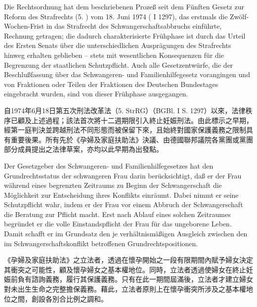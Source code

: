 \documentclass[12pt]{article}
\begin{document}
\begin{sourcepara}[title={原文SondervotumMS.281}]
Die Rechtsordnung hat dem beschriebenen Prozeß seit dem Fünften Gesetz zur Reform des Strafrechts (5. \abbrStrRG{}) vom 18. Juni 1974 (\abbrBGBl{} I \abbrS{} 1297), das erstmals die Zwölf-Wochen-Frist in das Strafrecht des Schwangerschaftsabbruchs einführte, Rechnung getragen; die dadurch charakterisierte Frühphase ist durch das Urteil des Ersten Senats über die unterschiedlichen Ausprägungen des Strafrechts hinweg erhalten geblieben -- stets mit wesentlichen Konsequenzen für die Begrenzung der staatlichen Schutzpflicht. Auch alle Gesetzentwürfe, die der Beschlußfassung über das Schwangeren- und Familienhilfegesetz vorangingen und von Fraktionen oder Teilen der Fraktionen des Deutschen Bundestages eingebracht wurden, sind von dieser Frühphase ausgegangen.
\end{sourcepara}
\begin{transpara}
自1974年6月18日第五次刑法改革法（5. StrRG）（BGBl. I S. 1297）以來，法律秩序已顧及上述過程；該法首次將十二週期限引入終止妊娠刑法。由此標示之早期，經第一庭判決並跨越刑法不同形態而被保留下來，且始終對國家保護義務之限制具有重要後果。所有先於《孕婦及家庭扶助法》決議、由德國聯邦議院各黨團或黨團部分成員提出之法律草案，亦均以此早期為出發點。
\end{transpara}

\begin{sourcepara}[title={原文SondervotumMS.282}]
Der Gesetzgeber des Schwangeren- und Familienhilfegesetzes hat den Grundrechtsstatus der schwangeren Frau darin berücksichtigt, daß er der Frau während eines begrenzten Zeitraums zu Beginn der Schwangerschaft die Möglichkeit zur Entscheidung ihres Konflikts einräumt. Dabei nimmt er seine Schutzpflicht wahr, indem er der Frau vor einem Abbruch der Schwangerschaft die Beratung zur Pflicht macht. Erst nach Ablauf eines solchen Zeitraumes begründet er die volle Einstandspflicht der Frau für das ungeborene Leben. Damit schafft er im Grundsatz den je verhältnismäßigen Ausgleich zwischen den im Schwangerschaftskonflikt betroffenen Grundrechtspositionen.
\end{sourcepara}
\begin{transpara}
《孕婦及家庭扶助法》之立法者，透過在懷孕開始之一段有限期間內賦予婦女決定其衝突之可能性，顧及懷孕婦女之基本權地位。同時，立法者透過使婦女在終止妊娠前負有諮詢義務，履行其保護義務。只有在此一期間屆滿後，立法者才建立婦女對未出生生命之完整擔保義務。藉此，立法者原則上在懷孕衝突所涉及之基本權地位之間，創設各別合比例之調和。
\end{transpara}
\end{document}
